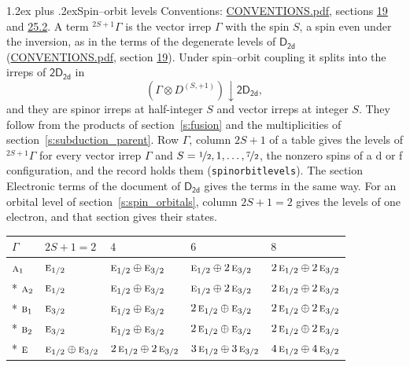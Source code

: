 \documentclass[10pt,a4paper]{article}
\makeatletter
\renewcommand\section{\@startsection{section}{1}{\z@}{-3ex plus -1ex minus -.2ex}%
  {1.2ex plus .2ex}{\normalfont\large\sffamily\bfseries\color{parttitle}}}
\numberwithin{equation}{section}
\newcommand{\grp}[1]{\mathsf{#1}}
\newcommand{\irr}[1]{\text{\normalfont\scshape #1}}
\newcommand{\restr}[2]{#1\!\downarrow#2}
\newcommand{\irrJp}[2]{D^{(#1,#2)}}
\newcommand{\irrprod}{\otimes}
\newcommand{\term}[2]{{}^{#1}#2}
\makeatother
\begin{document}
\section{Spin--orbit levels}\label{s:spin_orbit}
Conventions: \href{../../CONVENTIONS.pdf}{CONVENTIONS.pdf}, sections \href{../../../rotation/CONVENTIONS.pdf\#conv.19}{19} and \href{../../CONVENTIONS.pdf\#conv.25.2}{25.2}.
\leavevmode\label{n:local.spin}\label{n:symbol.term}A term $\term{2S+1}{\Gamma}$ is the vector irrep $\Gamma$ with the spin $S$, a spin even under the inversion, as in the terms of the degenerate levels of \href{../../../rotation/data/pdf/D2d.pdf}{$\grp{D_{2d}}$} (\href{../../CONVENTIONS.pdf}{CONVENTIONS.pdf}, section \href{../../../rotation/CONVENTIONS.pdf\#conv.19}{19}). Under spin--orbit coupling it splits into the irreps of $\grp{2D_{2d}}$ in
\begin{equation}\label{e:spinorbit}\restr{(\Gamma \irrprod \irrJp{S}{+1})}{\grp{2D_{2d}}},\end{equation}
and they are spinor irreps at half-integer $S$ and vector irreps at integer $S$. They follow from the products of section~\ref{s:fusion} and the multiplicities of section~\ref{s:subduction_parent}. Row $\Gamma$, column $2S + 1$ of a table gives the levels of $\term{2S+1}{\Gamma}$ for every vector irrep $\Gamma$ and $S = \nicefrac{1}{2}, 1, \dots, \nicefrac{7}{2}$, the nonzero spins of a d or f configuration, and the record holds them (\texttt{spinorbitlevels}). The section Electronic terms of the document of \href{../../../rotation/data/pdf/D2d.pdf}{$\grp{D_{2d}}$} gives the terms in the same way. For an orbital level of section~\ref{s:spin_orbitals}, column $2S + 1 = 2$ gives the levels of one electron, and that section gives their states.
{\small\setlength{\tabcolsep}{3pt}\begin{longtable}{@{}lllll@{}}\toprule
$\Gamma$ & $2S + 1 = 2$ & $4$ & $6$ & $8$\\\midrule\endhead
\bottomrule\endfoot\endlastfoot
$\irr{a}_{1}$ & $\irr{e}_{1/2}$ & $\irr{e}_{1/2}\oplus \irr{e}_{3/2}$ & $\irr{e}_{1/2}\oplus 2\,\irr{e}_{3/2}$ & $2\,\irr{e}_{1/2}\oplus 2\,\irr{e}_{3/2}$\\*
$\irr{a}_{2}$ & $\irr{e}_{1/2}$ & $\irr{e}_{1/2}\oplus \irr{e}_{3/2}$ & $\irr{e}_{1/2}\oplus 2\,\irr{e}_{3/2}$ & $2\,\irr{e}_{1/2}\oplus 2\,\irr{e}_{3/2}$\\*
$\irr{b}_{1}$ & $\irr{e}_{3/2}$ & $\irr{e}_{1/2}\oplus \irr{e}_{3/2}$ & $2\,\irr{e}_{1/2}\oplus \irr{e}_{3/2}$ & $2\,\irr{e}_{1/2}\oplus 2\,\irr{e}_{3/2}$\\*
$\irr{b}_{2}$ & $\irr{e}_{3/2}$ & $\irr{e}_{1/2}\oplus \irr{e}_{3/2}$ & $2\,\irr{e}_{1/2}\oplus \irr{e}_{3/2}$ & $2\,\irr{e}_{1/2}\oplus 2\,\irr{e}_{3/2}$\\*
$\irr{e}$ & $\irr{e}_{1/2}\oplus \irr{e}_{3/2}$ & $2\,\irr{e}_{1/2}\oplus 2\,\irr{e}_{3/2}$ & $3\,\irr{e}_{1/2}\oplus 3\,\irr{e}_{3/2}$ & $4\,\irr{e}_{1/2}\oplus 4\,\irr{e}_{3/2}$\\
\bottomrule\end{longtable}}
\end{document}
